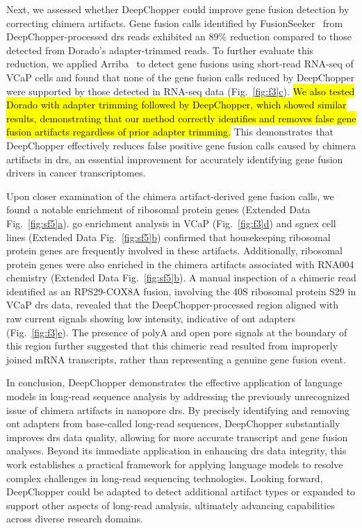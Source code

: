 \documentclass[pdflatex,sn-nature, lineno]{sn-jnl}%
\newcommand{\figref}[2]{Fig.~\hyperref[#1]{\ref*{#1}#2}}
\newcommand{\edfigref}[2]{Extended Data Fig.~\hyperref[#1]{\ref*{#1}#2}}
\begin{document}
Next, we assessed whether DeepChopper could improve gene fusion detection by correcting chimera artifacts. Gene fusion calls identified by FusionSeeker~\cite{chen2023gene} from DeepChopper-processed \gls{drs} reads exhibited an 89\% reduction compared to those detected from Dorado's adapter-trimmed reads.
To further evaluate this reduction, we applied Arriba~\cite{uhrig2021accurate} to detect gene fusions using short-read RNA-seq of VCaP cells and found that none of the gene fusion calls reduced by DeepChopper were supported by those detected in RNA-seq data (\figref{fig:f3}{c}).
\hl{We also tested Dorado with adapter trimming followed by DeepChopper, which showed similar results, demonstrating that our method correctly identifies and removes false gene fusion artifacts regardless of prior adapter trimming.}
This demonstrates that DeepChopper effectively reduces false positive gene fusion calls caused by chimera artifacts in \gls{drs}, an essential improvement for accurately identifying gene fusion drivers in cancer transcriptomes.

Upon closer examination of the chimera artifact-derived gene fusion calls, we found a notable enrichment of ribosomal protein genes (\edfigref{fig:sf5}{a}).
\gls{go} enrichment analysis in VCaP (\figref{fig:f3}{d}) and \gls{sgnex} cell lines (\edfigref{fig:sf5}{b}) confirmed that housekeeping ribosomal protein genes are frequently involved in these artifacts.
Additionally, ribosomal protein genes were also enriched in the chimera artifacts associated with RNA004 chemistry (\edfigref{fig:sf5}{b}).
A manual inspection of a chimeric read identified as an RPS29-COX8A fusion, involving the 40S ribosomal protein S29 in VCaP \gls{drs} data, revealed that the DeepChopper-processed region aligned with raw current signals showing low intensity, indicative of \gls{ont} adapters (\figref{fig:f3}{e}).
The presence of polyA and open pore signals at the boundary of this region further suggested that this chimeric read resulted from improperly joined mRNA transcripts, rather than representing a genuine gene fusion event.

In conclusion, DeepChopper demonstrates the effective application of language models in long-read sequence analysis by addressing the previously unrecognized issue of chimera artifacts in nanopore \gls{drs}. By precisely identifying and removing \gls{ont} adapters from base-called long-read sequences, DeepChopper substantially improves \gls{drs} data quality, allowing for more accurate transcript and gene fusion analyses. Beyond its immediate application in enhancing \gls{drs} data integrity, this work establishes a practical framework for applying language models to resolve complex challenges in long-read sequencing technologies. Looking forward, DeepChopper could be adapted to detect additional artifact types or expanded to support other aspects of long-read analysis, ultimately advancing capabilities across diverse research domains.
\end{document}
